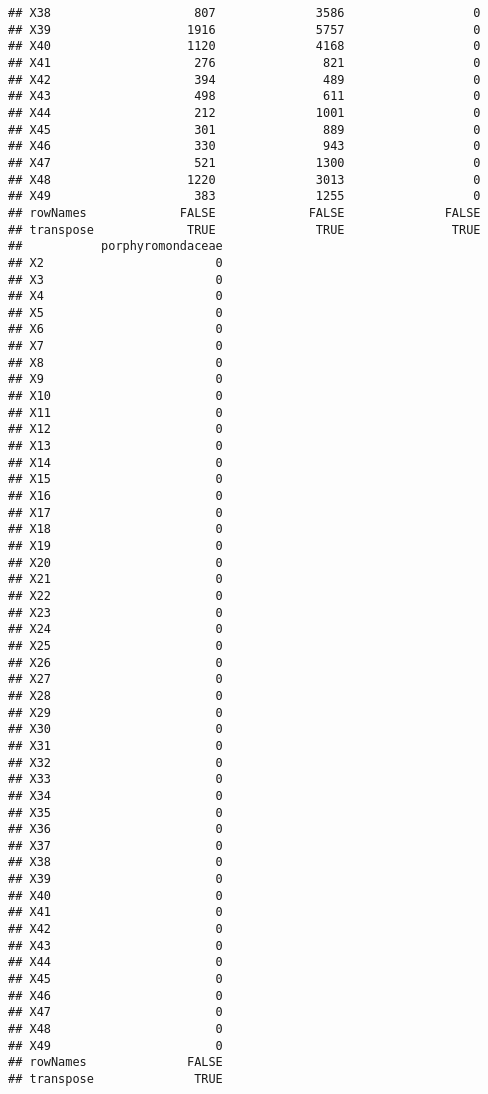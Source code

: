 \documentclass[12pt]{beamer}\usepackage[]{graphicx}\usepackage[]{color}
\makeatletter
\newenvironment{kframe}{%
 \def\at@end@of@kframe{}%
 \ifinner\ifhmode%
  \def\at@end@of@kframe{\end{minipage}}%
  \begin{minipage}{\columnwidth}%
 \fi\fi%
 \def\FrameCommand##1{\hskip\@totalleftmargin \hskip-\fboxsep
 \colorbox{shadecolor}{##1}\hskip-\fboxsep
     \hskip-\linewidth \hskip-\@totalleftmargin \hskip\columnwidth}%
 \MakeFramed {\advance\hsize-\width
   \@totalleftmargin\z@ \linewidth\hsize
   \@setminipage}}%
 {\par\unskip\endMakeFramed%
 \at@end@of@kframe}
\newenvironment{knitrout}{}{} %
\makeatother
\begin{document}
\begin{frame}[fragile]
\begin{knitrout}
\begin{kframe}
\begin{verbatim}
## X38                    807              3586                  0
## X39                   1916              5757                  0
## X40                   1120              4168                  0
## X41                    276               821                  0
## X42                    394               489                  0
## X43                    498               611                  0
## X44                    212              1001                  0
## X45                    301               889                  0
## X46                    330               943                  0
## X47                    521              1300                  0
## X48                   1220              3013                  0
## X49                    383              1255                  0
## rowNames             FALSE             FALSE              FALSE
## transpose             TRUE              TRUE               TRUE
##           porphyromondaceae
## X2                        0
## X3                        0
## X4                        0
## X5                        0
## X6                        0
## X7                        0
## X8                        0
## X9                        0
## X10                       0
## X11                       0
## X12                       0
## X13                       0
## X14                       0
## X15                       0
## X16                       0
## X17                       0
## X18                       0
## X19                       0
## X20                       0
## X21                       0
## X22                       0
## X23                       0
## X24                       0
## X25                       0
## X26                       0
## X27                       0
## X28                       0
## X29                       0
## X30                       0
## X31                       0
## X32                       0
## X33                       0
## X34                       0
## X35                       0
## X36                       0
## X37                       0
## X38                       0
## X39                       0
## X40                       0
## X41                       0
## X42                       0
## X43                       0
## X44                       0
## X45                       0
## X46                       0
## X47                       0
## X48                       0
## X49                       0
## rowNames              FALSE
## transpose              TRUE
\end{verbatim}
\begin{alltt}

\end{alltt}
\end{kframe}
\end{knitrout}
\end{frame}
\end{document}
